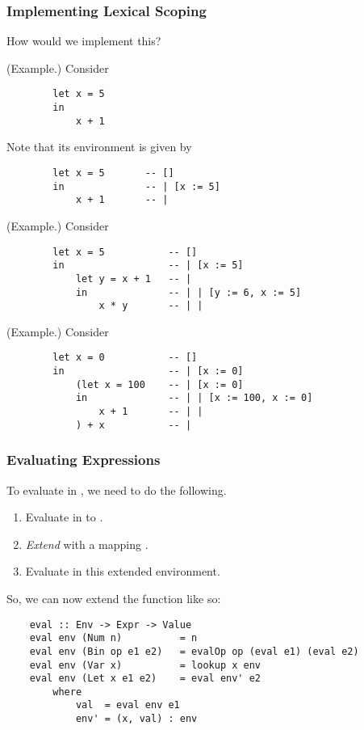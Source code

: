 \documentclass[letterpaper]{article}
\begin{document}
\subsubsection{Implementing Lexical Scoping}
How would we implement this? 

\begin{mdframed}[]
    (Example.) Consider 
    \begin{verbatim}
        let x = 5
        in 
            x + 1\end{verbatim}
    Note that its environment is given by 
    \begin{verbatim}
        let x = 5       -- []
        in              -- | [x := 5]
            x + 1       -- | \end{verbatim}
\end{mdframed}

\begin{mdframed}[]
    (Example.) Consider
    \begin{verbatim}
        let x = 5           -- []
        in                  -- | [x := 5]
            let y = x + 1   -- | 
            in              -- | | [y := 6, x := 5]
                x * y       -- | |\end{verbatim}
\end{mdframed}

\begin{mdframed}[]
    (Example.) Consider 
    \begin{verbatim}
        let x = 0           -- []
        in                  -- | [x := 0]
            (let x = 100    -- | [x := 0]
            in              -- | | [x := 100, x := 0]
                x + 1       -- | | 
            ) + x           -- |\end{verbatim}

 \end{mdframed}

\subsubsection{Evaluating  Expressions}
To evaluate  in , we need to do the following. 
\begin{enumerate}
    \item Evaluate  in  to .
    \item \emph{Extend}  with a mapping \code{["x" := val]}.
    \item Evaluate  in this extended environment.
\end{enumerate}
So, we can now extend the  function like so: 
\begin{verbatim}
    eval :: Env -> Expr -> Value
    eval env (Num n)          = n
    eval env (Bin op e1 e2)   = evalOp op (eval e1) (eval e2)
    eval env (Var x)          = lookup x env
    eval env (Let x e1 e2)    = eval env' e2
        where
            val  = eval env e1
            env' = (x, val) : env    
\end{verbatim}
\end{document}
